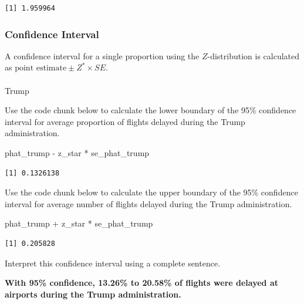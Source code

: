 \documentclass[
  letterpaper,
  DIV=11,
  numbers=noendperiod]{scrartcl}
\makeatletter
\let\oldparagraph\paragraph
\renewcommand{\paragraph}{
    \@ifstar
      \xxxParagraphStar
      \xxxParagraphNoStar
  }
\newcommand{\xxxParagraphStar}[1]{\oldparagraph*{#1}\mbox{}}
\newcommand{\xxxParagraphNoStar}[1]{\oldparagraph{#1}\mbox{}}
\newenvironment{Shaded}{\begin{snugshade}}{\end{snugshade}}
\newcommand{\NormalTok}[1]{\textcolor[rgb]{0.00,0.23,0.31}{#1}}
\newcommand{\SpecialCharTok}[1]{\textcolor[rgb]{0.37,0.37,0.37}{#1}}
\makeatother
\begin{document}
\begin{verbatim}
[1] 1.959964
\end{verbatim}

\subsubsection{Confidence Interval}\label{confidence-interval}

A confidence interval for a single proportion using the
\(Z\)-distribution is calculated as
\(\text{point estimate} \pm Z^* \times SE\).

\paragraph{Trump}\label{trump}

Use the code chunk below to calculate the lower boundary of the 95\%
confidence interval for average proportion of flights delayed during the
Trump administration.

\begin{Shaded}
\begin{Highlighting}[]
\NormalTok{phat\_trump }\SpecialCharTok{{-}}\NormalTok{ z\_star }\SpecialCharTok{*}\NormalTok{ se\_phat\_trump}
\end{Highlighting}
\end{Shaded}

\begin{verbatim}
[1] 0.1326138
\end{verbatim}

Use the code chunk below to calculate the upper boundary of the 95\%
confidence interval for average number of flights delayed during the
Trump administration.

\begin{Shaded}
\begin{Highlighting}[]
\NormalTok{phat\_trump }\SpecialCharTok{+}\NormalTok{ z\_star }\SpecialCharTok{*}\NormalTok{ se\_phat\_trump}
\end{Highlighting}
\end{Shaded}

\begin{verbatim}
[1] 0.205828
\end{verbatim}

Interpret this confidence interval using a complete sentence.

\begin{tcolorbox}[enhanced jigsaw, toprule=.15mm, breakable, leftrule=.75mm, bottomrule=.15mm, rightrule=.15mm, colback=white, opacityback=0, colframe=quarto-callout-warning-color-frame, left=2mm, arc=.35mm]

\textbf{With 95\% confidence, 13.26\% to 20.58\% of flights were delayed
at airports during the Trump administration.}

\end{tcolorbox}
\end{document}

